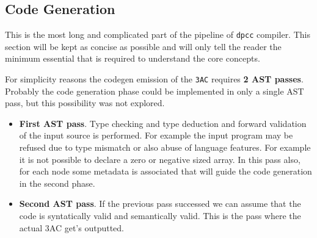 \documentclass[a4paper]{article}
\begin{document}
\subsection{Code Generation}

This is the most long and complicated part of the pipeline of \texttt{dpcc} compiler.
This section will be kept as concise as possible and will only tell the reader the minimum essential that is required
to understand the core concepts.

For simplicity reasons the codegen emission of the \texttt{3AC} requires \textbf{2 AST passes}. Probably the code generation
phase could be implemented in only a single AST pass, but this possibility was not explored.

\begin{itemize}
    \item \textbf{First AST pass}. Type checking and type deduction and forward validation of the input source is performed. For example the input program may be refused due to type mismatch or also abuse of language features. For example it is not possible to declare a zero or negative sized array. In this pass also, for each node some metadata is associated that will guide the code generation in the second phase.
    \item \textbf{Second AST pass}. If the previous pass successed we can assume that the code is syntatically valid and semantically valid. This is the pass where the actual 3AC get's outputted.
\end{itemize}
\end{document}
